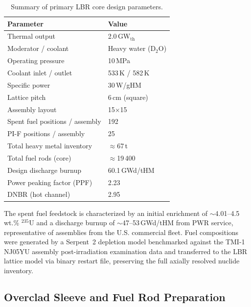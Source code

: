 \begin{table}[H]
\centering
\caption{Summary of primary LBR core design parameters.}
\label{tab:core_params}
\renewcommand{\arraystretch}{1.35}
\begin{tabular}{l l}
\toprule
\textbf{Parameter} & \textbf{Value} \\
\midrule
Thermal output              & 2.0\,GW$_\text{th}$ \\
Moderator / coolant         & Heavy water (D$_2$O) \\
Operating pressure          & 10\,MPa \\
Coolant inlet / outlet      & 533\,K / 582\,K \\
Specific power              & 30\,W/gHM \\
Lattice pitch               & 6\,cm (square) \\
Assembly layout             & 15$\times$15 \\
Spent fuel positions / assembly & 192 \\
PI-F positions / assembly   & 25 \\
Total heavy metal inventory & $\approx$67\,t \\
Total fuel rods (core)      & $\approx$19\,400 \\
Design discharge burnup     & 60.1\,GWd/tHM \\
Power peaking factor (PPF)  & 2.23 \\
DNBR (hot channel)          & 2.95 \\
\bottomrule
\end{tabular}
\end{table}

The spent fuel feedstock is characterized by an initial enrichment of
$\sim$4.01--4.5\,wt.\% $^{235}$U and a discharge burnup of
$\sim$47--53\,GWd/tHM from PWR service, representative of assemblies from
the U.S. commercial fleet. Fuel compositions were generated by a
Serpent~2 depletion model benchmarked against the TMI-1 NJ05YU assembly
post-irradiation examination data and transferred to the LBR lattice model
via binary restart file, preserving the full axially resolved nuclide
inventory.

\subsection{Overclad Sleeve and Fuel Rod Preparation}

